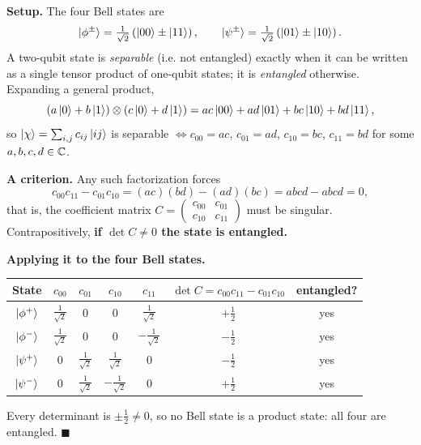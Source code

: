 \documentclass[a4paper, 10pt]{article}
\begin{document}
\begin{proofbox}
	\noindent \textbf{Setup.} The four Bell states are
	\[
		\ket{\phi^{\pm}} = \tfrac{1}{\sqrt{2}}\left(\ket{00} \pm \ket{11}\right), \qquad
		\ket{\psi^{\pm}} = \tfrac{1}{\sqrt{2}}\left(\ket{01} \pm \ket{10}\right) .
	\]
	A two-qubit state is \emph{separable} (i.e. not entangled) exactly when it can be written as a single tensor product of one-qubit states; it is \emph{entangled} otherwise.
	Expanding a general product,
	\[
		\left(a\ket{0} + b\ket{1}\right) \otimes \left(c\ket{0} + d\ket{1}\right)
		= ac\ket{00} + ad\ket{01} + bc\ket{10} + bd\ket{11},
	\]
	so \( \ket{\chi} = \sum_{i,j} c_{ij}\ket{ij} \) is separable \( \iff c_{00} = ac \), \( c_{01} = ad \), \( c_{10} = bc \), \( c_{11} = bd \) for some \( a, b, c, d \in \mathbb{C} \).

	\noindent \textbf{A criterion.} Any such factorization forces
	\[
		c_{00}c_{11} - c_{01}c_{10} = (ac)(bd) - (ad)(bc) = abcd - abcd = 0,
	\]
	that is, the coefficient matrix \( C = \begin{pmatrix} c_{00} & c_{01} \\ c_{10} & c_{11} \end{pmatrix} \) must be singular.
	Contrapositively, \textbf{if \( \det C \ne 0 \) the state is entangled.}

	\myspace

	\noindent \textbf{Applying it to the four Bell states.}
	\begin{center}
		\renewcommand{\arraystretch}{1.4}
		\begin{tabular}{ccccccc}
			\toprule
			State                & \( c_{00} \)              & \( c_{01} \)              & \( c_{10} \)               & \( c_{11} \)               & \( \det C = c_{00}c_{11} - c_{01}c_{10} \) & entangled? \\
			\midrule
			\( \ket{\phi^{+}} \) & \( \frac{1}{\sqrt{2}} \) & \( 0 \)                   & \( 0 \)                    & \( \frac{1}{\sqrt{2}} \)  & \( +\frac{1}{2} \)                        & yes        \\
			\( \ket{\phi^{-}} \) & \( \frac{1}{\sqrt{2}} \) & \( 0 \)                   & \( 0 \)                    & \( -\frac{1}{\sqrt{2}} \) & \( -\frac{1}{2} \)                        & yes        \\
			\( \ket{\psi^{+}} \) & \( 0 \)                   & \( \frac{1}{\sqrt{2}} \) & \( \frac{1}{\sqrt{2}} \)  & \( 0 \)                    & \( -\frac{1}{2} \)                        & yes        \\
			\( \ket{\psi^{-}} \) & \( 0 \)                   & \( \frac{1}{\sqrt{2}} \) & \( -\frac{1}{\sqrt{2}} \) & \( 0 \)                    & \( +\frac{1}{2} \)                        & yes        \\
			\bottomrule
		\end{tabular}
	\end{center}
	Every determinant is \( \pm\tfrac{1}{2} \ne 0 \), so no Bell state is a product state: all four are entangled. \( \blacksquare \)


\end{proofbox}
\end{document}
